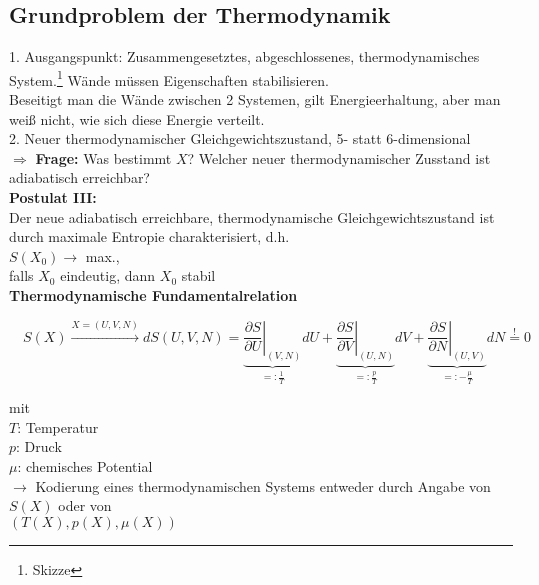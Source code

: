 \documentclass[10pt,article,colorback,accentcolor=tud9d]{scrartcl}
\begin{document}
 \subsection{Grundproblem der Thermodynamik}
 1. Ausgangspunkt: Zusammengesetztes, abgeschlossenes, thermodynamisches System.\footnote{Skizze} Wände müssen Eigenschaften stabilisieren.\\
 Beseitigt man die Wände zwischen  2 Systemen, gilt Energieerhaltung, aber man weiß nicht, wie sich diese Energie verteilt.\\
 2. Neuer thermodynamischer Gleichgewichtszustand, 5- statt 6-dimensional\\
 $\Rightarrow$ \textbf{Frage:} Was bestimmt $X$? Welcher neuer thermodynamischer Zusstand ist adiabatisch erreichbar?\\
 \textbf{Postulat III:}\\
Der neue adiabatisch erreichbare, thermodynamische Gleichgewichtszustand ist durch maximale Entropie charakterisiert, d.h.\\
 $S(X_0) \rightarrow$  max.,\\ 
falls $X_0$ eindeutig, dann $X_0$ stabil\\
 \textbf{Thermodynamische Fundamentalrelation}
\begin{fleqn}
\begin{equation}
 \quad S(X) \xrightarrow{X=(U,V,N)} dS(U,V,N)= 
\underbrace{\left.\frac{\partial S}{\partial U}\right|_{(V,N)}}
  _{=:\frac{1}{T}} dU  + 
\underbrace{\left.\frac{\partial S}{\partial V}\right|_{(U,N)}}
  _{=:\frac{p}{T}} dV + 
\underbrace{\left.\frac{\partial S}{\partial N}\right|
  _{(U,V)}}_{=:-\frac{\mu}{T}} dN \stackrel{!}{=}0
\end{equation}
\end{fleqn}
mit\\
$T$: Temperatur\\
$p$: Druck\\
$\mu$: chemisches Potential\\
$\rightarrow$ Kodierung eines thermodynamischen Systems entweder durch Angabe von\\
$S(X)$ oder von \\
$(T(X),p(X),\mu(X))$ \\
\end{document}
